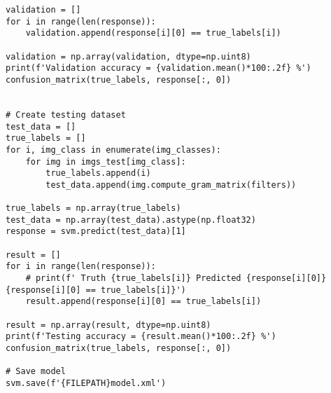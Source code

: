\documentclass[11pt]{article}
\begin{document}
\begin{lstlisting}
validation = []
for i in range(len(response)):
    validation.append(response[i][0] == true_labels[i])

validation = np.array(validation, dtype=np.uint8)
print(f'Validation accuracy = {validation.mean()*100:.2f} %')
confusion_matrix(true_labels, response[:, 0])


# Create testing dataset
test_data = []
true_labels = []
for i, img_class in enumerate(img_classes):
    for img in imgs_test[img_class]:
        true_labels.append(i)
        test_data.append(img.compute_gram_matrix(filters))

true_labels = np.array(true_labels)
test_data = np.array(test_data).astype(np.float32)
response = svm.predict(test_data)[1]

result = []
for i in range(len(response)):
    # print(f' Truth {true_labels[i]} Predicted {response[i][0]} {response[i][0] == true_labels[i]}')
    result.append(response[i][0] == true_labels[i])

result = np.array(result, dtype=np.uint8)
print(f'Testing accuracy = {result.mean()*100:.2f} %')
confusion_matrix(true_labels, response[:, 0])

# Save model
svm.save(f'{FILEPATH}model.xml')
\end{lstlisting}

\end{document}
